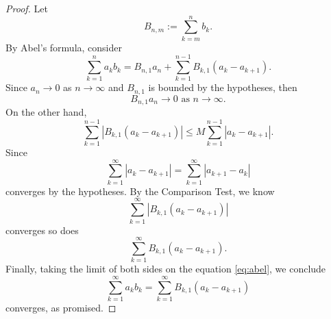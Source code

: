 \begin{Exercise}
\begin{proof}
Let $$B_{n,m} := \sum_{k=m}^{n}b_k.$$
By Abel's formula, consider \begin{equation}\label{eq:abel}
\sum_{k=1}^{n}a_k b_k = 
B_{n,1}a_n + \sum_{k=1}^{n-1}B_{k,1}(a_k-a_{k+1}).
\end{equation}
Since $a_n\to 0$ as $n\to\infty$ and $B_{n,1}$ is bounded by the hypotheses, then $$B_{n,1}a_n\to 0\text{ as }n\to\infty.$$
On the other hand, $$\sum_{k=1}^{n-1}\left|B_{k,1}(a_k-a_{k+1})\right| \leq
M\sum_{k=1}^{n-1}\left|a_k-a_{k+1}\right|.$$ Since $$\sum_{k=1}^{\infty}\left|a_k-a_{k+1}\right| =
\sum_{k=1}^{\infty}\left|a_{k+1}-a_k\right|$$ converges by the hypotheses. By the Comparison Test, we know $$\sum_{k=1}^{\infty}\left|B_{k,1}(a_k-a_{k+1})\right|$$ converges so does $$\sum_{k=1}^{\infty}B_{k,1}(a_k-a_{k+1}).$$
Finally, taking the limit of both sides on the equation \eqref{eq:abel}, we conclude $$\sum_{k=1}^{\infty}a_k b_k = 
\sum_{k=1}^{\infty}B_{k,1}(a_k-a_{k+1})$$ converges, as promised.
\end{proof}
\end{Exercise}